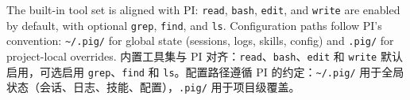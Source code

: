 The built-in tool set is aligned with PI: \texttt{read}, \texttt{bash}, \texttt{edit}, and \texttt{write} are enabled by default, with optional \texttt{grep}, \texttt{find}, and \texttt{ls}. Configuration paths follow PI's convention: \texttt{\textasciitilde/.pig/} for global state (sessions, logs, skills, config) and \texttt{.pig/} for project-local overrides.
内置工具集与 PI 对齐：\texttt{read}、\texttt{bash}、\texttt{edit} 和 \texttt{write} 默认启用，可选启用 \texttt{grep}、\texttt{find} 和 \texttt{ls}。配置路径遵循 PI 的约定：\texttt{\textasciitilde/.pig/} 用于全局状态（会话、日志、技能、配置），\texttt{.pig/} 用于项目级覆盖。

